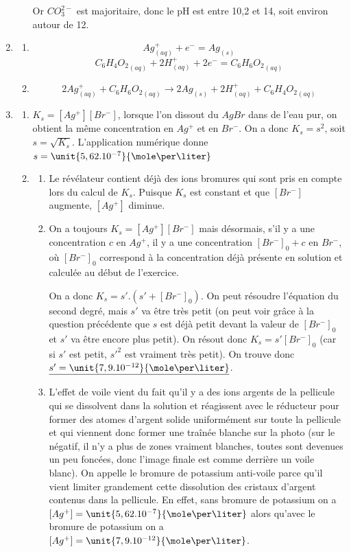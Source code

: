 \documentclass[10pt,a4paper]{article}
\begin{document}
\begin{enumerate}
\begin{enumerate}
Or $CO_3^{2-}$ est majoritaire, donc le pH est entre 10,2 et 14, soit environ autour de 12.
\end{enumerate}
\item
\begin{enumerate}
\item $$Ag^+_{(aq)} + e^- = Ag_{(s)}$$
$${C_6H_4O_2}_{(aq)}+2H^+_{(aq)}+2e^-={C_6H_6O_2}_{(aq)}$$
\item $$\boxed{2Ag^+_{(aq)}+{C_6H_6O_2}_{(aq)}\longrightarrow 2Ag_{(s)}+2H^+_{(aq)}+{C_6H_4O_2}_{(aq)}}$$
\end{enumerate}
\item 
\begin{enumerate}
\item $K_s=[Ag^+][Br^-]$, lorsque l'on dissout du $AgBr$ dans de l'eau pur, on obtient la même concentration en $Ag^+$ et en $Br^-$. On a donc $K_s=s^2$, soit
$\boxed{s=\sqrt{K_s}}$. L'application numérique donne $s=\unit{5,62.10^{-7}}{\mole\per\liter}$
\item
\begin{enumerate}
\item Le révélateur contient déjà des ions bromures qui sont pris en compte lors du calcul de $K_s$. Puisque $K_s$ est constant et que $[Br^-]$ augmente,
$[Ag^+]$ diminue.
\item On a toujours $K_s=[Ag^+][Br^-]$ mais désormais, s'il y a une concentration $c$ en $Ag^+$, il y a une concentration $[Br^-]_0+c$ en $Br^-$, où
 $[Br^-]_0$ correspond à la concentration déjà présente en solution et calculée au début de l'exercice.

On a donc $K_s=s'.(s'+[Br^-]_0)$. On peut résoudre l'équation du second degré, mais $s'$ va être très petit (on peut voir grâce à la question précédente que
$s$ est déjà petit devant la valeur de $[Br^-]_0$ et $s'$ va être encore plus petit). On résout donc $\boxed{K_s=s'[Br^-]_0}$ (car si $s'$ est petit, $s'^2$ 
est vraiment très petit). On trouve donc $\underline{s'=\unit{7,9.10^{-12}}{\mole\per\liter}}$.
\item L'effet de voile vient du fait qu'il y a des ions argents de la pellicule qui se dissolvent dans la solution et réagissent avec le réducteur pour
former des  atomes d'argent solide uniformément sur toute la pellicule et qui viennent donc former
une traînée blanche sur la photo (sur le négatif, il n'y a plus de zones vraiment blanches, toutes sont devenues un peu foncées, donc l'image finale
est comme derrière un voile blanc). On appelle le bromure de potassium anti-voile parce qu'il vient limiter grandement cette dissolution des cristaux d'argent
contenus dans la pellicule. En effet, sans bromure de potassium on a $[Ag^+]=\unit{5,62.10^{-7}}{\mole\per\liter}$ alors qu'avec le bromure de potassium on a
$[Ag^+]=\unit{7,9.10^{-12}}{\mole\per\liter}$.
\end{enumerate}
\end{enumerate}
\end{enumerate}
\end{document}
